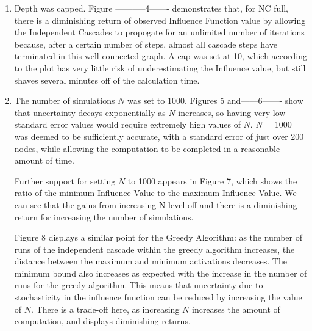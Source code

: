 \documentclass[11pt]{scrartcl} %
\begin{document}
\begin{enumerate}
\begin{enumerate}
\setlength{\parindent}{5ex}
\item Depth was capped.  Figure -----------4------- demonstrates that, for NC full, there is a diminishing return of observed Influence Function value by allowing the Independent Cascades to propogate for an unlimited number of iterations because, after a certain number of steps, almost all cascade steps have terminated in this well-connected graph.  A cap was set at 10, which according to the plot has very little risk of underestimating the Influence value, but still shaves several minutes off of the calculation time.  \\
\item \par The number of simulations $N$ was set to 1000.  Figures 5 and------6------- show that uncertainty decays exponentially as $N$ increases, so having very low standard error values would require extremely high values of $N$.  $N$ = 1000 was deemed to be sufficiently accurate, with a standard error of just over 200 nodes, while allowing the computation to be completed in a reasonable amount of time.  
\par
Further support for setting $N$ to 1000 appears in Figure 7, which shows the ratio of the minimum Influence Value to the maximum Influence Value.  We can see that the gains from increasing N level off and there is a diminishing return for increasing the number of simulations.  
\par
Figure 8 displays a similar point for the Greedy Algorithm: as the number of runs of the independent cascade within the greedy algorithm increases, the distance between the maximum and minimum activations decreases. The minimum bound also increases as expected with the increase in the number of runs for the greedy algorithm.  This means that uncertainty due to stochasticity in the influence function can be reduced by increasing the value of $N$.  There is a trade-off here, as increasing $N$ increases the amount of computation, and displays diminishing returns.  
\end{enumerate}


\end{enumerate}
\end{document}
